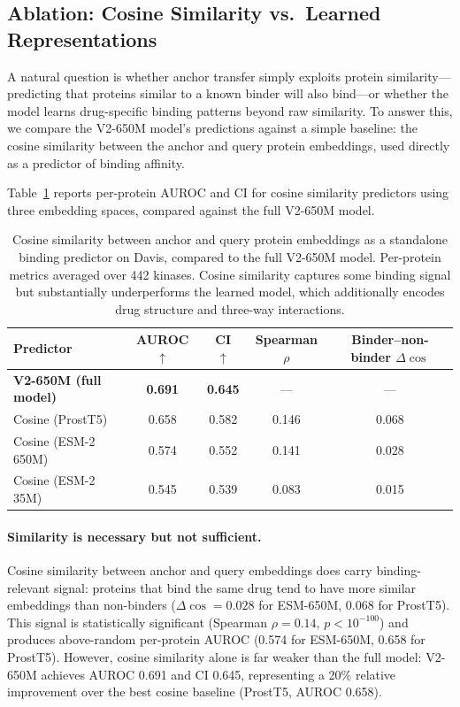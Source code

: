 \subsection{Ablation: Cosine Similarity vs.\ Learned Representations}
\label{sec:cosine_ablation}

A natural question is whether anchor transfer simply exploits protein similarity---predicting that proteins similar to a known binder will also bind---or whether the model learns drug-specific binding patterns beyond raw similarity. To answer this, we compare the V2-650M model's predictions against a simple baseline: the cosine similarity between the anchor and query protein embeddings, used directly as a predictor of binding affinity.

Table~\ref{tab:cosine_ablation} reports per-protein AUROC and CI for cosine similarity predictors using three embedding spaces, compared against the full V2-650M model.

\begin{table}[t]
    \centering
    \caption{Cosine similarity between anchor and query protein embeddings as a standalone binding predictor on Davis, compared to the full V2-650M model. Per-protein metrics averaged over 442 kinases. Cosine similarity captures some binding signal but substantially underperforms the learned model, which additionally encodes drug structure and three-way interactions.}
    \label{tab:cosine_ablation}
    \begin{tabular}{lcccc}
        \toprule
        Predictor & AUROC $\uparrow$ & CI $\uparrow$ & Spearman $\rho$ & Binder--non-binder $\Delta\cos$ \\
        \midrule
        \textbf{V2-650M (full model)} & \textbf{0.691} & \textbf{0.645} & --- & --- \\
        \midrule
        Cosine (ProstT5) & 0.658 & 0.582 & 0.146 & 0.068 \\
        Cosine (ESM-2 650M) & 0.574 & 0.552 & 0.141 & 0.028 \\
        Cosine (ESM-2 35M) & 0.545 & 0.539 & 0.083 & 0.015 \\
        \bottomrule
    \end{tabular}
\end{table}

\paragraph{Similarity is necessary but not sufficient.}
Cosine similarity between anchor and query embeddings does carry binding-relevant signal: proteins that bind the same drug tend to have more similar embeddings than non-binders ($\Delta\cos = 0.028$ for ESM-650M, $0.068$ for ProstT5). This signal is statistically significant (Spearman $\rho = 0.14$, $p < 10^{-100}$) and produces above-random per-protein AUROC (0.574 for ESM-650M, 0.658 for ProstT5). However, cosine similarity alone is far weaker than the full model: V2-650M achieves AUROC 0.691 and CI 0.645, representing a 20\% relative improvement over the best cosine baseline (ProstT5, AUROC 0.658).

